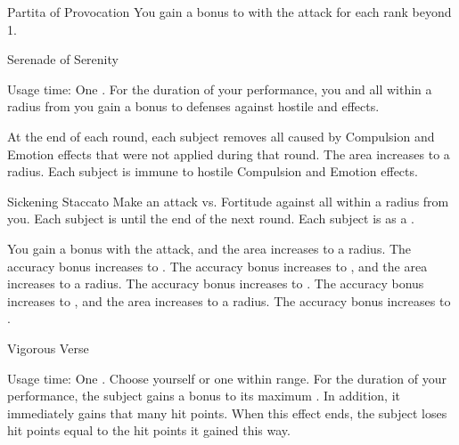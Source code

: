 {\begin{durationability}{Partita of Provocation}
                \rankline
                You gain a  bonus to  with the attack for each rank beyond 1.
            \end{durationability}

            \begin{durationability}{Serenade of Serenity}
                \par \noindent Usage time: One .
                \rankline
                For the duration of your performance, you and all  within a \largearea radius from you gain a  bonus to defenses against hostile  and  effects.

                \rankline
                 At the end of each round, each subject removes all  caused by Compulsion and Emotion effects that were not applied during that round.
                 The area increases to a \areahuge radius.
                 Each subject is immune to hostile Compulsion and Emotion effects.
            \end{durationability}

            \begin{durationability}{Sickening Staccato}
                \rankline
                Make an attack vs. Fortitude against all  within a \areamed radius from you.
                \hit Each subject is \sickened until the end of the next round.
                \crit Each subject is \sickened as a .

                \rankline
                 You gain a   bonus with the attack, and the area increases to a \largearea radius.
                 The accuracy bonus increases to .
                 The accuracy bonus increases to , and the area increases to a \hugearea radius.
                 The accuracy bonus increases to .
                 The accuracy bonus increases to , and the area increases to a \gargarea radius.
                 The accuracy bonus increases to .
            \end{durationability}

            \begin{durationability}{Vigorous Verse}
                \par \noindent Usage time: One .
                \rankline
                Choose yourself or one  within \rngmed range.
                For the duration of your performance, the subject gains a  bonus to its maximum .
                In addition, it immediately gains that many hit points.
                When this effect ends, the subject loses hit points equal to the hit points it gained this way.


\end{durationability}}
